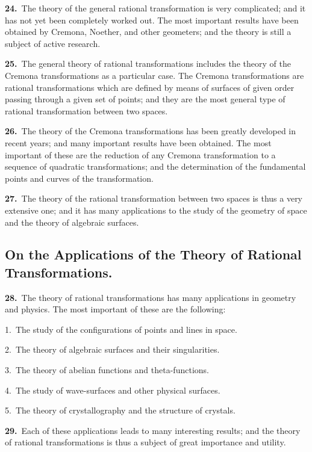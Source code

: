 \documentclass[11pt,a4paper]{article}
\begin{document}
\textbf{24.}\ The theory of the general rational transformation is very complicated; and it has not yet been completely worked out. The most important results have been obtained by Cremona, Noether, and other geometers; and the theory is still a subject of active research.

\newpage
\setcounter{page}{197}

\noindent\textbf{25.}\ The general theory of rational transformations includes the theory of the Cremona transformations as a particular case. The Cremona transformations are rational transformations which are defined by means of surfaces of given order passing through a given set of points; and they are the most general type of rational transformation between two spaces.

\textbf{26.}\ The theory of the Cremona transformations has been greatly developed in recent years; and many important results have been obtained. The most important of these are the reduction of any Cremona transformation to a sequence of quadratic transformations; and the determination of the fundamental points and curves of the transformation.

\textbf{27.}\ The theory of the rational transformation between two spaces is thus a very extensive one; and it has many applications to the study of the geometry of space and the theory of algebraic surfaces.

\subsection*{On the Applications of the Theory of Rational Transformations.}

\textbf{28.}\ The theory of rational transformations has many applications in geometry and physics. The most important of these are the following:

1.\ The study of the configurations of points and lines in space.

2.\ The theory of algebraic surfaces and their singularities.

3.\ The theory of abelian functions and theta-functions.

4.\ The study of wave-surfaces and other physical surfaces.

5.\ The theory of crystallography and the structure of crystals.

\textbf{29.}\ Each of these applications leads to many interesting results; and the theory of rational transformations is thus a subject of great importance and utility.
\end{document}
